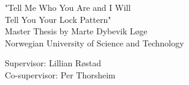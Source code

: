 \begin{titlepage}
\begin{center}
	
	\vspace{2cm}

	{\Huge "Tell Me Who You Are and I Will}\\[0.4cm]
	{\Huge Tell You Your Lock Pattern"} \\[5cm]


	{\Large Master Thesis by Marte Dybevik Løge} \\[0.4cm]
	{\Large Norwegian University of Science and Technology}\\

	\vspace{9.0cm}



	{\Large Supervisor: Lillian Røstad} \\ [0.2cm]
	{\Large Co-supervisor: Per Thorsheim} \\ [0.2cm]
	
\end{center}
\end{titlepage}